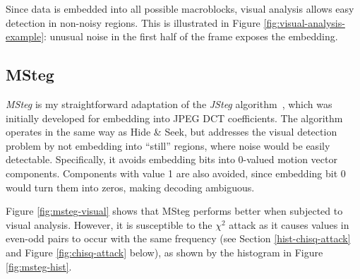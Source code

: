 \documentclass[12pt,british,twoside,notitlepage,usenames,dvipsnames,hypens,final]{report}
\numberwithin{equation}{section}
\numberwithin{figure}{section}
\begin{document}
Since data is embedded into all possible macroblocks, visual analysis allows easy detection in non-noisy regions. This is illustrated in Figure \ref{fig:visual-analysis-example}: unusual noise in the first half of the frame exposes the embedding. 

\subsection{MSteg}
\label{msteg}

\emph{MSteg} is my straightforward adaptation of the \emph{JSteg} algorithm~\cite{bateman}, which was initially developed for embedding into JPEG DCT coefficients. The algorithm operates in the same way as Hide \& Seek, but addresses the visual detection problem by not embedding into ``still'' regions, where noise would be easily detectable. Specifically, it avoids embedding bits into 0-valued motion vector components. Components with value 1 are also avoided, since embedding bit 0 would turn them into zeros, making decoding ambiguous.

Figure \ref{fig:msteg-visual} shows that MSteg performs better when subjected to visual analysis. However, it is susceptible to the $\chi^2$ attack as it causes values in even-odd pairs to occur with the same frequency (see Section \ref{hist-chisq-attack} and Figure \ref{fig:chisq-attack} below), as shown by the histogram in Figure \ref{fig:msteg-hist}.
\end{document}
